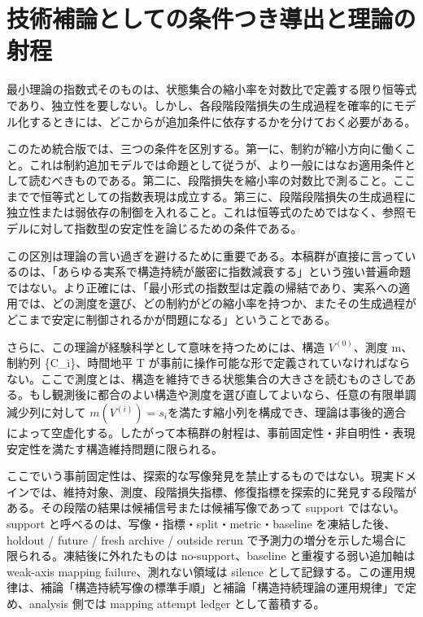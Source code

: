 \documentclass[12pt,a4paper]{article}
\begin{document}
\section{技術補論としての条件つき導出と理論の射程}\label{ux6280ux8853ux88dcux8ad6ux3068ux3057ux3066ux306eux6761ux4ef6ux3064ux304dux5c0eux51faux3068ux7406ux8ad6ux306eux5c04ux7a0b}

最小理論の指数式そのものは、状態集合の縮小率を対数比で定義する限り恒等式であり、独立性を要しない。しかし、各段階段階損失の生成過程を確率的にモデル化するときには、どこからが追加条件に依存するかを分けておく必要がある。

このため統合版では、三つの条件を区別する。第一に、制約が縮小方向に働くこと。これは制約追加モデルでは命題として従うが、より一般にはなお適用条件として読むべきものである。第二に、段階損失を縮小率の対数比で測ること。ここまでで恒等式としての指数表現は成立する。第三に、段階段階損失の生成過程に独立性または弱依存の制御を入れること。これは恒等式のためではなく、参照モデルに対して指数型の安定性を論じるための条件である。

この区別は理論の言い過ぎを避けるために重要である。本稿群が直接に言っているのは、「あらゆる実系で構造持続が厳密に指数減衰する」という強い普遍命題ではない。より正確には、「最小形式の指数型は定義の帰結であり、実系への適用では、どの測度を選び、どの制約がどの縮小率を持つか、またその生成過程がどこまで安定に制御されるかが問題になる」ということである。

さらに、この理論が経験科学として意味を持つためには、構造 \(V^{(0)}\)、測度 m、制約列 \{C\_i\}、時間地平 T が事前に操作可能な形で定義されていなければならない。ここで測度とは、構造を維持できる状態集合の大きさを読むものさしである。もし観測後に都合のよい構造や測度を選び直してよいなら、任意の有限単調減少列に対して \(m(V^{(i)}) = s_{i}\)を満たす縮小列を構成でき、理論は事後的適合によって空虚化する。したがって本稿群の射程は、事前固定性・非自明性・表現安定性を満たす構造維持問題に限られる。

ここでいう事前固定性は、探索的な写像発見を禁止するものではない。現実ドメインでは、維持対象、測度、段階損失指標、修復指標を探索的に発見する段階がある。その段階の結果は候補信号または候補写像であって support ではない。support と呼べるのは、写像・指標・split・metric・baseline を凍結した後、holdout / future / fresh archive / outside rerun で予測力の増分を示した場合に限られる。凍結後に外れたものは no-support、baseline と重複する弱い追加軸は weak-axis mapping failure、測れない領域は silence として記録する。この運用規律は、補論「構造持続写像の標準手順」と補論「構造持続理論の運用規律」で定め、analysis 側では mapping attempt ledger として蓄積する。
\end{document}
